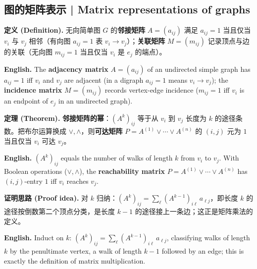 \documentclass[UTF8,11pt,a4paper]{ctexart}
\newcommand{\EN}[1]{\par\noindent \textbf{English.} #1\par}
\newcommand{\DEF}[2]{\par\noindent\textbf{定义 (Definition).} #1\par\EN{#2}}
\newcommand{\THM}[2]{\par\noindent\textbf{定理 (Theorem).} #1\par\EN{#2}}
\newcommand{\PRF}[2]{\par\noindent\textbf{证明思路 (Proof idea).} #1\par\EN{#2}}
\begin{document}
\subsection{图的矩阵表示 | Matrix representations of graphs}
\DEF{无向简单图 $G$ 的\textbf{邻接矩阵} $A=(a_{ij})$ 满足 $a_{ij}=1$ 当且仅当 $v_i$ 与 $v_j$ 相邻（有向图 $a_{ij}=1$ 表 $v_i\to v_j$）；\textbf{关联矩阵} $M=(m_{ij})$ 记录顶点与边的关联（无向图 $m_{ij}=1$ 当且仅当 $v_i$ 是 $e_j$ 的端点）。}{The \textbf{adjacency matrix} $A=(a_{ij})$ of an undirected simple graph has $a_{ij}=1$ iff $v_i$ and $v_j$ are adjacent (in a digraph $a_{ij}=1$ means $v_i\to v_j$); the \textbf{incidence matrix} $M=(m_{ij})$ records vertex-edge incidence ($m_{ij}=1$ iff $v_i$ is an endpoint of $e_j$ in an undirected graph).}
\THM{\textbf{邻接矩阵的幂}：$(A^k)_{ij}$ 等于从 $v_i$ 到 $v_j$ 长度为 $k$ 的途径条数。把布尔运算换成 $\vee,\wedge$，则\textbf{可达矩阵} $P=A^{(1)}\vee\cdots\vee A^{(n)}$ 的 $(i,j)$ 元为 $1$ 当且仅当 $v_i$ 可达 $v_j$。}{$(A^k)_{ij}$ equals the number of walks of length $k$ from $v_i$ to $v_j$. With Boolean operations ($\vee,\wedge$), the \textbf{reachability matrix} $P=A^{(1)}\vee\cdots\vee A^{(n)}$ has $(i,j)$-entry $1$ iff $v_i$ reaches $v_j$.}
\PRF{对 $k$ 归纳：$(A^k)_{ij}=\sum_\ell(A^{k-1})_{i\ell}\,a_{\ell j}$，即长度 $k$ 的途径按倒数第二个顶点分类，是长度 $k-1$ 的途径接上一条边；这正是矩阵乘法的定义。}{Induct on $k$: $(A^k)_{ij}=\sum_\ell(A^{k-1})_{i\ell}\,a_{\ell j}$, classifying walks of length $k$ by the penultimate vertex, a walk of length $k-1$ followed by an edge; this is exactly the definition of matrix multiplication.}
\end{document}
